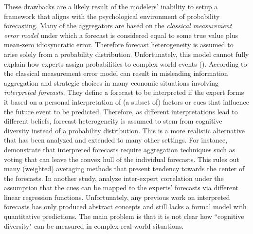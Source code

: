 \documentclass[11pt]{article}
\theoremstyle{definition}
\theoremstyle{definition}
\begin{document}
These drawbacks are a likely result of the modelers' inability to setup a framework that aligns with the psychological environment of probability forecasting. Many of the aggregators are based on the \textit{classical measurement error model} under which a forecast is considered equal to some true value plus mean-zero idiosyncratic error. Therefore forecast heterogeneity is assumed to arise solely from a probability distribution. Unfortunately, this model cannot fully explain how experts assign probabilities to complex world events (\cite{parunak2013exploiting}). According to \cite{hong2009interpreted} the classical measurement error model can result in misleading information aggregation and strategic choices in many economic situations involving \textit{interpreted forecasts}. They define a forecast to be interpreted if the expert forms it based on a personal interpretation of (a subset of) factors or cues that influence the future event to be predicted. Therefore, as different interpretations lead to different beliefs, forecast heterogeneity is assumed to stem from cognitive diversity instead of a probability distribution. This is a more realistic alternative that has been analyzed and extended to many other settings. For instance, \cite{parunak2013characterizing} demonstrate that interpreted forecasts require aggregation techniques such as voting that can leave the convex hull of the individual forecasts. This rules out many (weighted) averaging methods that present tendency towards the center of the forecasts. In another study, \cite{broomell2009experts} analyze inter-expert correlation under the assumption that the cues can be mapped to the experts' forecasts via different linear regression functions. Unfortunately, any previous work on interpreted forecasts has only produced abstract concepts and still lacks a formal model with quantitative predictions. The main problem is that it is not clear how ``cognitive diversity" can be measured in complex real-world situations.
\end{document}
